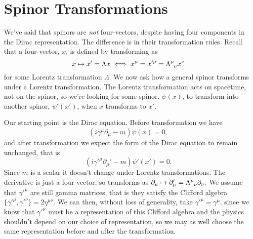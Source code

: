 \documentclass[fleqn]{NotesClass}
\begin{document}
    \section{Spinor Transformations}
    We've said that spinors are \emph{not} four-vectors, despite having four components in the Dirac representation.
    The difference is in their transformation rules.
    Recall that a four-vector, \(x\), is defined by transforming as
    \begin{equation}
        x \mapsto x' = \Lambda x \iff x^\mu = x'^\mu = \tensor{\Lambda}{^\mu_\nu}x^\nu
    \end{equation}
    for some Lorentz transformation \(\Lambda\).
    We now ask how a general spinor transforms under a Lorentz transformation.
    The Lorentz transformation acts on spacetime, not on the spinor, so we're looking for some spinor, \(\psi(x)\), to transform into another spinor, \(\psi'(x')\), when \(x\) transforms to \(x'\).
    
    Our starting point is the Dirac equation.
    Before transformation we have
    \begin{equation}
        (i\gamma^\mu \partial_\mu - m)\psi(x) = 0,
    \end{equation}
    and after transformation we expect the form of the Dirac equation to remain unchanged, that is
    \begin{equation}
        (i\gamma'^\mu \partial_\mu' - m)\psi'(x') = 0.
    \end{equation}
    Since \(m\) is a scalar it doesn't change under Lorentz transformations.
    The derivative is just a four-vector, so transforms as \(\partial_\mu \mapsto \partial'_\mu = \tensor{\Lambda}{^\mu_\nu}\partial_\nu\).
    We assume that \(\gamma'^\mu\) are still gamma matrices, that is they satisfy the Clifford algebra \(\{\gamma'^\mu, \gamma'^\nu\} = 2\eta^{\mu\nu}\).
    We can then, without loss of generality, take \(\gamma'^\mu = \gamma^\mu\), since we know that \(\gamma'^\mu\) must be a representation of this Clifford algebra and the physics shouldn't depend on our choice of representation, so we may as well choose the same representation before and after the transformation.
    
\end{document}
